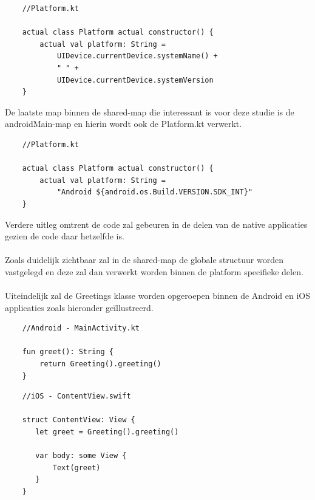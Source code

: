 \begin{lstlisting}
    //Platform.kt
    
    actual class Platform actual constructor() {
        actual val platform: String = 
            UIDevice.currentDevice.systemName() + 
            " " + 
            UIDevice.currentDevice.systemVersion
    }
\end{lstlisting}

De laatste map binnen de shared-map die interessant is voor deze studie is de androidMain-map en hierin wordt ook de Platform.kt verwerkt.

\begin{lstlisting}
    //Platform.kt
    
    actual class Platform actual constructor() {
        actual val platform: String = 
            "Android ${android.os.Build.VERSION.SDK_INT}"
    }
\end{lstlisting}

Verdere uitleg omtrent de code zal gebeuren in de delen van de native applicaties gezien de code daar hetzelfde is.
\\ \\ 
Zoals duidelijk zichtbaar zal in de shared-map de globale structuur worden vastgelegd en deze zal dan verwerkt worden binnen de platform specifieke delen.
\\ \\ 
Uiteindelijk zal de Greetings klasse worden opgeroepen binnen de Android en iOS applicaties zoals hieronder geïllustreerd.
\begin{lstlisting}
    //Android - MainActivity.kt
    
    fun greet(): String {
        return Greeting().greeting()
    }
\end{lstlisting}
\begin{lstlisting}
    //iOS - ContentView.swift
    
    struct ContentView: View {
       let greet = Greeting().greeting()
       
       var body: some View {
           Text(greet)
       }
    }
   
\end{lstlisting}

